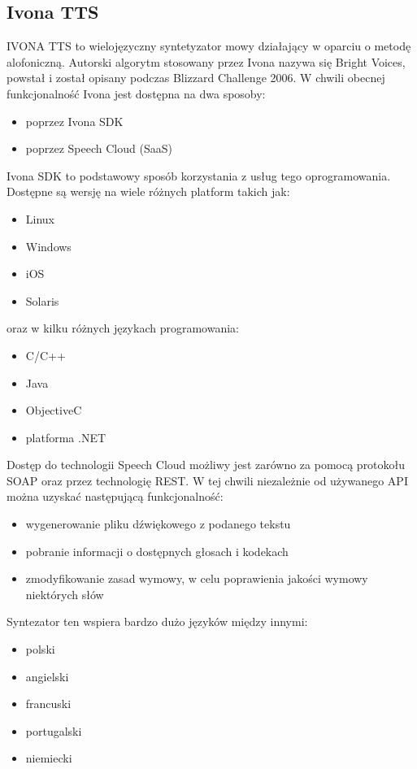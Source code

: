 \subsection{Ivona TTS}
IVONA TTS \cite{ivonasite} to wielojęzyczny syntetyzator mowy działający w oparciu o metodę alofoniczną. Autorski algorytm stosowany przez Ivona nazywa się Bright Voices,  powstał i został opisany podczas Blizzard Challenge 2006. W chwili obecnej funkcjonalność Ivona jest dostępna na dwa sposoby:
\begin{itemize}
	\item poprzez Ivona SDK
	\item poprzez Speech Cloud (SaaS)
\end{itemize}
Ivona SDK to podstawowy sposób korzystania z usług tego oprogramowania. Dostępne są wersję na wiele różnych platform takich jak:
\begin{itemize}
	\item Linux
	\item Windows
	\item iOS
	\item Solaris
\end{itemize}
oraz w kilku różnych językach programowania:
\begin{itemize}
	\item C/C++
	\item Java
	\item ObjectiveC
	\item platforma .NET
\end{itemize}
Dostęp do technologii Speech Cloud możliwy jest zarówno za pomocą protokołu SOAP oraz przez technologię REST. W tej chwili niezależnie od używanego API można uzyskać następującą funkcjonalność:
\begin{itemize}
	\item wygenerowanie pliku dźwiękowego z podanego tekstu
	\item pobranie informacji o dostępnych głosach i kodekach
	\item zmodyfikowanie zasad wymowy, w celu poprawienia jakości wymowy niektórych słów
\end{itemize}
Syntezator ten wspiera bardzo dużo języków między innymi:
 \begin{itemize}
	\item polski
	\item angielski
	\item francuski
	\item portugalski
	\item niemiecki
\end{itemize}
